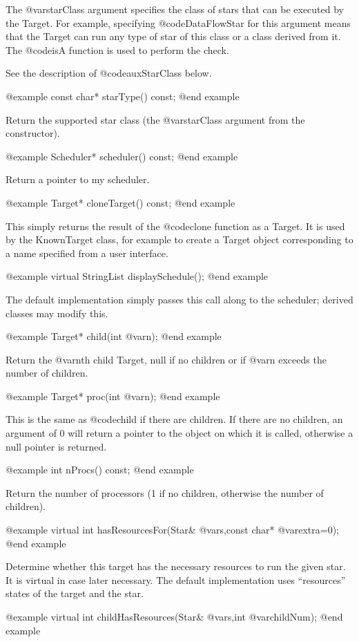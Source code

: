 The @var{starClass} argument specifies the class of stars that can be
executed by the Target.  For example, specifying @code{DataFlowStar}
for this argument means that the Target can run any type of star of
this class or a class derived from it.  The @code{isA} function is
used to perform the check.

See the description of @code{auxStarClass} below.

@example
const char* starType() const;
@end example

Return the supported star class (the @var{starClass} argument from
the constructor).

@example
Scheduler* scheduler() const;
@end example

Return a pointer to my scheduler.

@example
Target* cloneTarget() const;
@end example

This simply returns the result of the @code{clone} function as a Target.
It is used by the KnownTarget class, for example to create a Target
object corresponding to a name specified from a user interface.

@example
virtual StringList displaySchedule();
@end example

The default implementation simply passes this call along to the
scheduler; derived classes may modify this.

@example
Target* child(int @var{n});
@end example

Return the @var{n}th child Target, null if no children or if
@var{n} exceeds the number of children.

@example
Target* proc(int @var{n});
@end example

This is the same as @code{child} if there are children.  If
there are no children, an argument of 0 will return a pointer
to the object on which it is called, otherwise a null pointer
is returned.

@example
int nProcs() const;
@end example

Return the number of processors (1 if no children, otherwise the
number of children).

@example
virtual int hasResourcesFor(Star& @var{s},const char* @var{extra}=0);
@end example

Determine whether this target has the necessary resources to run the
given star.  It is virtual in case later necessary.  The default implementation
uses ``resources'' states of the target and the star.

@example
virtual int childHasResources(Star& @var{s},int @var{childNum});
@end example

